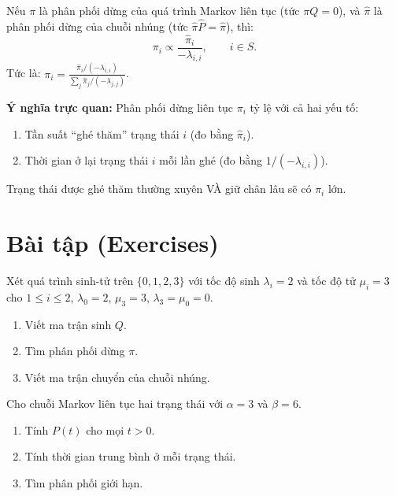\begin{dinhly}
Nếu $\pi$ là phân phối dừng của quá trình Markov liên tục (tức $\pi Q = 0$),
và $\hat{\pi}$ là phân phối dừng của chuỗi nhúng (tức $\hat{\pi} \hat{P} = \hat{\pi}$), thì:
\begin{equation}\label{eq:pi-hat-relation}
  \pi_i \propto \frac{\hat{\pi}_i}{-\lambda_{i,i}}, \qquad i \in S.
\end{equation}
Tức là: $\pi_i = \frac{\hat{\pi}_i / (-\lambda_{i,i})}{\sum_j \hat{\pi}_j / (-\lambda_{j,j})}$.
\end{dinhly}

\textbf{Ý nghĩa trực quan:} Phân phối dừng liên tục $\pi_i$ tỷ lệ với cả hai yếu tố:
\begin{enumerate}[nosep]
  \item Tần suất ``ghé thăm'' trạng thái $i$ (đo bằng $\hat{\pi}_i$).
  \item Thời gian ở lại trạng thái $i$ mỗi lần ghé (đo bằng $1/(-\lambda_{i,i})$).
\end{enumerate}
Trạng thái được ghé thăm thường xuyên VÀ giữ chân lâu sẽ có $\pi_i$ lớn.

\section{Bài tập (Exercises)}
\label{sec:ch9-exercises}

\begin{exercise}
Xét quá trình sinh-tử trên $\{0, 1, 2, 3\}$ với tốc độ sinh $\lambda_i = 2$ và tốc độ tử $\mu_i = 3$ cho $1 \leq i \leq 2$, $\lambda_0 = 2$, $\mu_3 = 3$, $\lambda_3 = \mu_0 = 0$.
\begin{enumerate}[nosep]
  \item Viết ma trận sinh $Q$.
  \item Tìm phân phối dừng $\pi$.
  \item Viết ma trận chuyển của chuỗi nhúng.
\end{enumerate}
\end{exercise}

\begin{exercise}
Cho chuỗi Markov liên tục hai trạng thái với $\alpha = 3$ và $\beta = 6$.
\begin{enumerate}[nosep]
  \item Tính $P(t)$ cho mọi $t > 0$.
  \item Tính thời gian trung bình ở mỗi trạng thái.
  \item Tìm phân phối giới hạn.
\end{enumerate}
\end{exercise}

